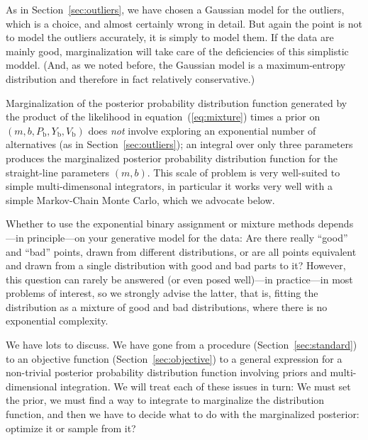 \documentclass[12pt,twoside]{article}
\newcommand{\sectionname}{Section}
\newcommand{\equationname}{equation}
\newcounter{problem}
\newcommand{\Pbad}{P_{\mathrm{b}}}
\newcommand{\Ybad}{Y_{\mathrm{b}}}
\newcommand{\Vbad}{V_{\mathrm{b}}}
\begin{document}
As in \sectionname~\ref{sec:outliers}, we have chosen a Gaussian model
for the outliers, which is a choice, and almost certainly wrong in
detail.  But again the point is not to model the outliers accurately,
it is simply to model them.  If the data are mainly good,
marginalization will take care of the deficiencies of this simplistic
moddel.  (And, as we noted before, the Gaussian model is a
maximum-entropy distribution and therefore in fact relatively
conservative.)

Marginalization of the posterior probability distribution function
generated by the product of the likelihood in
\equationname~(\ref{eq:mixture}) times a prior on
$(m,b,\Pbad,\Ybad,\Vbad)$ does \emph{not} involve exploring an
exponential number of alternatives (as in
\sectionname~\ref{sec:outliers}); an integral over only three
parameters produces the marginalized posterior probability
distribution function for the straight-line parameters $(m,b)$.  This
scale of problem is very well-suited to simple multi-dimensonal
integrators, in particular it works very well with a simple
Markov-Chain Monte Carlo, which we advocate below.

Whether to use the exponential binary assignment or mixture methods
depends---in principle---on your generative model for the data: Are
there really ``good'' and ``bad'' points, drawn from different
distributions, or are all points equivalent and drawn from a single
distribution with good and bad parts to it?  However, this question
can rarely be answered (or even posed well)---in practice---in most
problems of interest, so we strongly advise the latter, that is,
fitting the distribution as a mixture of good and bad distributions,
where there is no exponential complexity.

We have lots to discuss.  We have gone from a procedure
(\sectionname~\ref{sec:standard}) to an objective function
(\sectionname~\ref{sec:objective}) to a general expression for a
non-trivial posterior probability distribution function involving
priors and multi-dimensional integration.  We will treat each of
these issues in turn: We must set the prior, we must find a way to
integrate to marginalize the distribution function, and then we have
to decide what to do with the marginalized posterior: optimize it or
sample from it?
\end{document}
